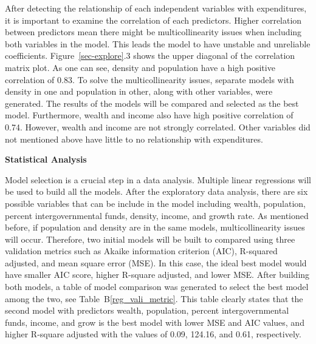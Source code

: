 \documentclass[11pt]{article}\usepackage[]{graphicx}\usepackage[]{color}
\begin{document}
\noindent After detecting the relationship of each independent variables with expenditures, it is important to examine the correlation of each predictors. Higher correlation between predictors mean there might be multicollinearity issues when including both variables in the model. This leads the model to have unstable and unreliable coefficients. Figure~\ref{sec-explore}.3 shows the upper diagonal of the correlation matrix plot. As one can see, density and population have a high positive correlation of 0.83. To solve the multicollinearity issues, separate models with density in one and population in other, along with other variables, were generated. The results of the models will be compared and selected as the best model. Furthermore, wealth and income also have high positive correlation of 0.74. However, wealth and income are not strongly correlated. Other variables did not mentioned above have little to no relationship with expenditures.          
\hfill \break

\noindent\textbf{Statistical Analysis}



\noindent Model selection is a crucial step in a data analysis. Multiple linear regressions will be used to build all the models. After the exploratory data analysis, there are six possible variables that can be include in the model including wealth, population, percent intergovernmental funds, density, income, and growth rate. As mentioned before, if population and density are in the same models, multicollinearity issues will occur. Therefore, two initial models will be built to compared using three validation metrics such as Akaike information criterion (AIC), R-squared adjusted, and mean square error (MSE). In this case, the ideal best model would have smaller AIC score, higher R-square adjusted, and lower MSE. After building both models, a table of model comparison was generated to select the best model among the two, see Table~B\ref{reg_vali_metric}. This table clearly states that the second model with predictors wealth, population, percent intergovernmental funds, income, and grow is the best model with lower MSE and AIC values, and higher R-square adjusted with the values of 0.09, 124.16, and 0.61, respectively.
\end{document}
